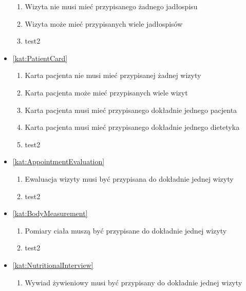 \begin{itemize}[label={\textbf{Reguły dla}}, wide, labelwidth=!, labelindent=0pt]
\begin{enumerate}[label={\textbf{REG/\protect\threedigits{\arabic{enumi}}}}, wide, labelwidth=!, align=left, leftmargin=3cm, resume]
        \item Wizyta nie musi mieć przypisanego żadnego jadłospisu
        \item Wizyta może mieć przypisanych wiele jadłospisów
        \item test2
    \end{enumerate}
    \item\ref{kat:PatientCard}
    \begin{enumerate}[label={\textbf{REG/\protect\threedigits{\arabic{enumi}}}}, wide, labelwidth=!, align=left, leftmargin=3cm, resume]
        \item Karta pacjenta nie musi mieć przypisanej żadnej wizyty
        \item Karta pacjenta może mieć przypisanych wiele wizyt
        \item Karta pacjenta musi mieć przypisanego dokładnie jednego pacjenta
        \item Karta pacjenta musi mieć przypisanego dokładnie jednego dietetyka
        \item test2
    \end{enumerate}
    \item\ref{kat:AppointmentEvaluation}
    \begin{enumerate}[label={\textbf{REG/\protect\threedigits{\arabic{enumi}}}}, wide, labelwidth=!, align=left, leftmargin=3cm, resume]
        \item Ewaluacja wizyty musi być przypisana do dokładnie jednej wizyty
        \item test2
    \end{enumerate}
    \item\ref{kat:BodyMeasurement}
    \begin{enumerate}[label={\textbf{REG/\protect\threedigits{\arabic{enumi}}}}, wide, labelwidth=!, align=left, leftmargin=3cm, resume]
        \item Pomiary ciała muszą być przypisane do dokładnie jednej wizyty
        \item test2
    \end{enumerate}
    \item\ref{kat:NutritionalInterview}
    \begin{enumerate}[label={\textbf{REG/\protect\threedigits{\arabic{enumi}}}}, wide, labelwidth=!, align=left, leftmargin=3cm, resume]
        \item Wywiad żywieniowy musi być przypisany do dokładnie jednej wizyty

\end{enumerate}
\end{itemize}
